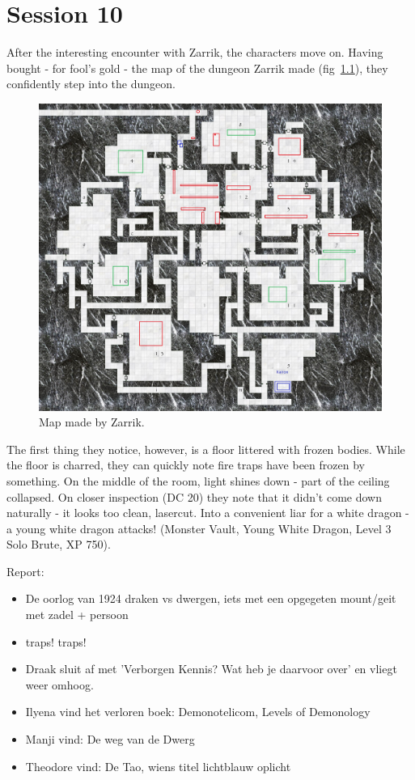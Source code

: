 \chapter{Session 10}
After the interesting encounter with Zarrik, the characters move on. Having bought - for fool's gold - the map of the dungeon Zarrik made (fig~\ref{fig:firsttemple}), they confidently step into the dungeon.
\begin{figure}[h]
    \centering
    \includegraphics[height=.5\textheight]{fig/firsttemple.jpg}
    \caption{\label{fig:firsttemple} Map made by Zarrik.}
\end{figure}

The first thing they notice, however, is a floor littered with frozen bodies. While the floor is charred, they can quickly note fire traps have been frozen by something. On the middle of the room, light shines down - part of the ceiling collapsed. On closer inspection (DC 20) they note that it didn't come down naturally - it looks too clean, lasercut. Into a convenient liar for a white dragon - a young white dragon attacks! (Monster Vault, Young White Dragon, Level 3 Solo Brute, XP 750).

Report:
\begin{itemize}
\item De oorlog van 1924 draken vs dwergen, iets met een opgegeten mount/geit met zadel + persoon
\item traps! traps!
\item Draak sluit af met 'Verborgen Kennis? Wat heb je daarvoor over' en vliegt weer omhoog.
\item Ilyena vind het verloren boek: Demonotelicom, Levels of Demonology
\item Manji vind: De weg van de Dwerg
\item Theodore vind: De Tao, wiens titel lichtblauw oplicht
\end{itemize}